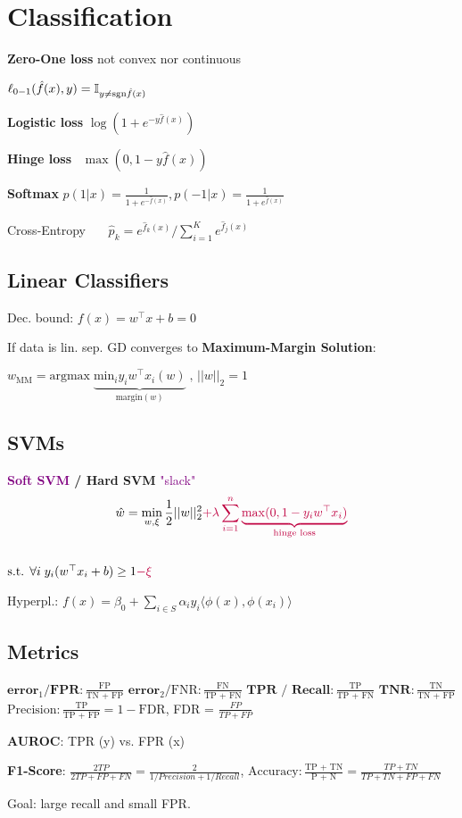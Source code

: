 \section*{Classification}

\textbf{Zero-One loss} \quad not convex nor continuous

\qquad \qquad $\ell_{0-1}(\hat{f}(x), y) = \mathbb{I}_{y \neq \text{sgn} \hat{f}(x)}$

\textbf{Logistic loss} \quad $\log(1 + e^{-y \hat{f}(x)})$

\textbf{Hinge loss} \quad \ $\max(0, 1-y \hat{f}(x))$

\textbf{Softmax} $p(1 | x) = \frac{1}{1 + e^{- \hat{f}(x)}}, p(-1 | x) = \frac{1}{1 + e^{\hat{f}(x)}}$ 

Cross-Entropy \ \ \ $\hat{p}_k = e^{\hat{f}_k(x)} / \sum_{i=1}^K e^{\hat{f}_j(x)}$

\subsection*{Linear Classifiers}

Dec. bound: $f(x) = w^\top x + b  = 0$

If data is lin. sep. GD  converges to \textbf{Maximum-Margin Solution}: 

$w_{\text{MM}} = \text{argmax} \; \underbrace{\text{min}_i y_i w^\top x_i (w)}_{\text{margin}(w)} \; \text{, } ||w||_2 = 1$ \\[-15pt]
 
\subsection*{SVMs}
 
\textbf{\textcolor{purple}{Soft SVM} / Hard SVM} \quad \textcolor{purple}{"slack"} 
$$\hat{w} = \min_{w, \xi} \frac{1}{2} ||w||_2^2 \textcolor{purple}{ + \lambda \sum_{i=1}^n \underbrace{\max (0, 1 - y_i w^\top x_i)}_{\text{hinge loss}}}$$ \\[-10pt]
$\text{s.t. } \forall i \;y_i ( w^\top x_i + b )\geq 1 \textcolor{purple}{- \xi}$ 

Hyperpl.: $f(x) = \beta_0 + \sum_{i \in S} \alpha_i y_i \langle \phi(x), \phi(x_i) \rangle$

\subsection*{Metrics} 
$\textbf{error}_1 / \textbf{FPR}: \frac{\text{FP}}{\text{TN + FP}}$
$\textbf{error}_2 / \text{FNR}: \frac{\text{FN}}{\text{TP + FN}}$
$\textbf{TPR / Recall}: \frac{\text{TP}}{\text{TP + FN}}$
$\textbf{TNR}: \frac{\text{TN}}{\text{TN + FP}}$
$\text{Precision}: \frac{\text{TP}}{\text{TP + FP}} = 1 - \text{FDR}$, FDR = $\frac{FP}{TP + FP}$

\textbf{AUROC}: TPR (y) vs. FPR (x)

\textbf{F1-Score}: $\frac{2TP}{2TP+FP+FN}=\frac{2}{1/Precision+1/Recall}$, $\text{Accuracy}: \frac{\text{TP + TN}}{\text{P + N}} = \frac{TP + TN}{TP + TN + FP + FN}$

Goal: large recall and small FPR.
